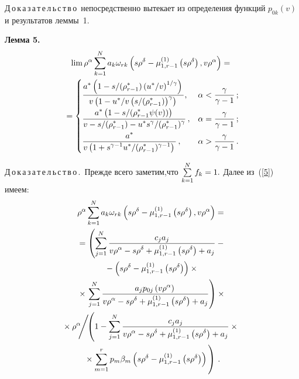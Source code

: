 \begin{multicols}{2}
\noindent
Д\,о\,к\,а\,з\,а\,т\,е\,л\,ь\,с\,т\,в\,о\
непосредственно вытекает из определения функций $p_{0k}(v)$ и результатов леммы~1.

\medskip

\noindent
\textbf{Лемма 5.} 
\begin{multline*}
\lim\rho^{\alpha} \sum\limits_{k=1}^N a_k\omega_{rk}\left(s\rho^{\delta}-\mu_{1,r-1}^{(1)}\left(s\rho^{\delta}\right),v
\rho^{\alpha}\right)={}\\
{}=
\begin{cases}
\displaystyle\frac{\displaystyle a^{*}\left(1-{s}/({\rho^*_{r-1}})\left({u^*}/{v}\right)^{{1}/{\gamma}}\right)\mathstrut}{\displaystyle v\left(1-{u^*}/{v}\left({s}/({\rho^*_{r-1}})\right)^{\gamma}\right)\mathstrut},&\alpha<\displaystyle\frac{\displaystyle \gamma\mathstrut}{\displaystyle \gamma-1\mathstrut}\,;\\[9pt]
\displaystyle\frac{\displaystyle a^{*}\left(1-{s}/({\rho^*_{r-1}\psi(v)})\right)\mathstrut}{\displaystyle v-{s}/({\rho_{r-1}^*})-
{u^*s^{\gamma}}/{(\rho^{*}_{r-1})^{\gamma}}\mathstrut}\,,& \alpha=\displaystyle\frac{\displaystyle \gamma\mathstrut}{\displaystyle \gamma-1\mathstrut}\,;\\[9pt]
\displaystyle\frac{\displaystyle a^{*}\mathstrut}{\displaystyle v\left(1+{s^{\gamma-1}u^*}/{(\rho_{r-1}^*)^{\gamma-1}}\right)\mathstrut}\,,& \alpha>\displaystyle\frac{\displaystyle \gamma\mathstrut}{\displaystyle \gamma-1\mathstrut}\,.
\end{cases}
\end{multline*}


\noindent
Д\,о\,к\,а\,з\,а\,т\,е\,л\,ь\,с\,т\,в\,о\,.\
Прежде всего заметим,что $\sum\limits_{k=1}^Nf_k\hm=1.$
Далее из~(\ref{5}) имеем:
\begin{multline*}
\rho^{\alpha} \sum\limits_{k=1}^N a_k\omega_{rk}\left(s\rho^{\delta}-\mu_{1,r-1}^{(1)}\left(
s\rho^{\delta}\right),v\rho^{\alpha}\right)={}\\
{}=\left(\sum\limits_{j=1}^N\fr{c_ja_j}{v\rho^{\alpha}-
s\rho^{\delta}+\mu_{1,r-1}^{(1)}\left(
s\rho^{\delta}\right)+a_j}-{}\right.\\
{}-
\left(s\rho^{\delta}-\mu_{1,r-1}^{(1)}\left(s\rho^{\delta}\right)\right)\times{}\\
{}\times
\left.\sum\limits_{j=1}^N\fr{a_jp_{0j}\left(v\rho^{\alpha}\right)}
{v\rho^{\alpha}-s\rho^{\delta}+\mu_{1,r-1}^{(1)}\left(s\rho^{\delta}\right)+a_j}\right)\times{}\\
\!{}\times
{\rho^{\alpha}}\!\!\Bigg / \!\!
\left(1-\sum\limits_{j=1}^N\fr{c_ja_j}{v\rho^{\alpha}-s\rho^{\delta}+
\mu_{1,r-1}^{(1)}\left(s\rho^{\delta}\right)+a_j}\times{}\right.\\
\left.{}\times
\sum\limits_{m=1}^rp_m\beta_m\left(s\rho^{\delta}-\mu_{1,r-1}^{(1)}\left(
s\rho^{\delta}\right)\right)
\vphantom{\sum\limits_{j=1}^N\fr{c_ja_j}{v\rho^{\alpha}-s\rho^{\delta}+
\mu_{1,r-1}^{(1)}\left(s\rho^{\delta}\right)+a_j}}
\right)\,.
\end{multline*}


\end{multicols}
